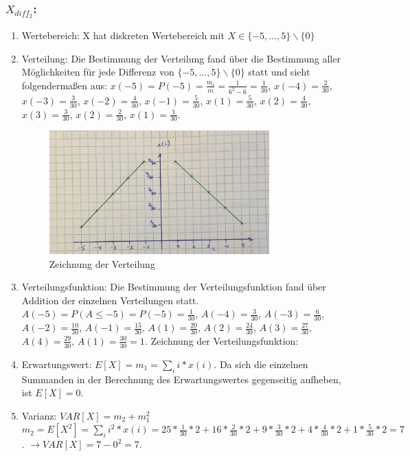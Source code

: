 \documentclass[%
10pt,              %
ngerman,           %
a4paper,           %
DIV11,             %
]{scrartcl}%
\begin{document}
\subsubsection*{$X_{diff_2}$:}

\begin{enumerate}
	\item Wertebereich: X hat diskreten Wertebereich mit $X \in \{-5, \dots, 5 \} \backslash \{0\}$
	\item Verteilung: Die Bestimmung der Verteilung fand über die Bestimmung aller Möglichkeiten für jede Differenz von $\{-5, \dots, 5 \} \backslash \{0\}$ statt und sieht folgendermaßen aus:\newline
	$x(-5) = P(-5) = \frac{m_i}{m} = \frac{1}{6^2 - 6} = \frac{1}{30}$,\newline
	$x(-4) = \frac{2}{30}$, $x(-3) = \frac{3}{30}$, $x(-2) = \frac{4}{30}$, $x(-1) = \frac{5}{30}$, $x(1) = \frac{5}{30}$, $x(2) = \frac{4}{30}$, $x(3) = \frac{3}{30}$, $x(2) = \frac{2}{30}$, $x(1) = \frac{1}{30}$. 
	
	\begin{figure}[!htbp]
		\centering
		\caption{Zeichnung der Verteilung}
		\includegraphics[width=0.8\textwidth]{X_diff1.png}
	\end{figure} 
	
	\item Verteilungsfunktion: Die Bestimmung der Verteilungsfunktion fand über Addition der einzelnen Verteilungen statt.\newline
	$A(-5) = P(A \leq -5) = P(-5) = \frac{1}{30}$,\newline
	$A(-4) = \frac{3}{30}$, $A(-3) = \frac{6}{30}$, $A(-2) = \frac{10}{30}$, $A(-1) = \frac{15}{30}$, $A(1) = \frac{20}{30}$, $A(2) = \frac{24}{30}$, $A(3) = \frac{27}{30}$, $A(4) = \frac{29}{30}$, $A(1) = \frac{30}{30} = 1$. Zeichnung der Verteilungsfunktion: 
	
	\item Erwartungswert: $E[X] = m_1 = \sum_{i} i * x(i)$. Da sich die einzelnen Summanden in der Berechnung des Erwartungswertes gegenseitig aufheben, ist $E[X] = 0$.
	\item Varianz: $VAR[X] = m_2 + m_1^2$\newline
	$m_2 = E[X^2] = \sum_{i} i^2 * x(i) = 25 * \frac{1}{30} * 2 + 16 * \frac{2}{30} * 2 + 9 * \frac{3}{30} * 2 + 4 * \frac{4}{30} * 2 + 1 * \frac{5}{30} * 2 = 7$.\newline
	$\rightarrow VAR[X] = 7 - 0^2 = 7$.
\end{enumerate}
\end{document}
